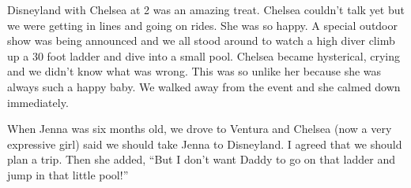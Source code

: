 Disneyland with Chelsea at 2 was an amazing treat. Chelsea couldn't talk yet
but we were getting in lines and going on rides. She was so happy.  A special
outdoor show was being announced and we all stood around to watch a high diver
climb up a 30 foot ladder and dive into a small pool. Chelsea became
hysterical, crying and we didn't know what was wrong. This was so unlike her
because she was always such a happy baby. We walked away from the event and she
calmed down immediately. 

When Jenna was six months old, we drove to Ventura
and Chelsea (now a very expressive girl) said we should take Jenna to
Disneyland. I agreed that we should plan a trip. Then she added, ``But I don't
want Daddy to go on that ladder and jump in that little pool!''
